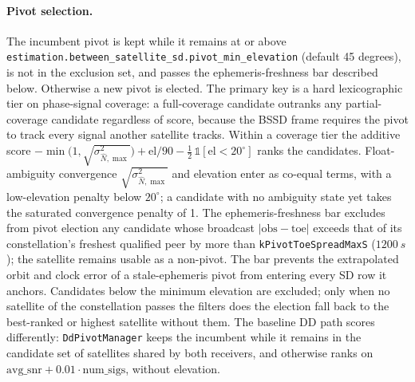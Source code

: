 \paragraph{Pivot selection.}
The incumbent pivot is kept while it remains at or above
\texttt{estimation.between\_satellite\_sd.pivot\_min\_elevation} (default
45 degrees), is not in the exclusion set, and passes the ephemeris-freshness bar
described below.  Otherwise a new pivot is elected.  The primary key is a hard
lexicographic tier on phase-signal coverage: a full-coverage candidate outranks any
partial-coverage candidate regardless of score, because the BSSD frame requires the
pivot to track every signal another satellite tracks.  Within a coverage tier the
additive score
$-\min\!\big(1,\sqrt{\sigma^2_{\hat N,\max}}\big) + \mathrm{el}/90 -
\tfrac12\,\mathbb{1}[\mathrm{el} < 20^\circ]$
ranks the candidates.  Float-ambiguity convergence $\sqrt{\sigma^2_{\hat N,\max}}$
and elevation enter as co-equal terms, with a low-elevation penalty below
$20^\circ$; a candidate with no ambiguity state yet takes the saturated convergence
penalty of 1.  The ephemeris-freshness bar excludes from pivot election any candidate
whose broadcast $|\text{obs} - \text{toe}|$ exceeds that of its constellation's
freshest qualified peer by more than \texttt{kPivotToeSpreadMaxS}
($\SI{1200}{s}$); the satellite remains usable as a non-pivot.  The bar prevents
the extrapolated orbit and clock error of a stale-ephemeris pivot from entering
every SD row it anchors.  Candidates below the minimum elevation are excluded; only
when no satellite of the constellation passes the filters does the election fall
back to the best-ranked or highest satellite without them.  The baseline DD path
scores differently: \texttt{DdPivotManager} keeps the incumbent while it remains in
the candidate set of satellites shared by both receivers, and otherwise ranks on
$\text{avg\_snr} + 0.01\cdot\text{num\_sigs}$, without elevation.

